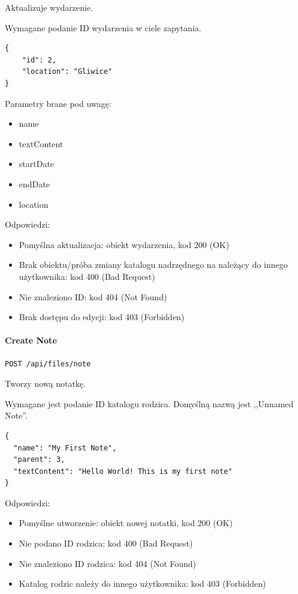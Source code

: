 \documentclass[a4paper,twoside,12pt]{book}
\begin{document}
Aktualizuje wydarzenie.

Wymagane podanie ID wydarzenia w ciele zapytania.

\begin{verbatim}
{
    "id": 2,
    "location": "Gliwice"
}
\end{verbatim}

Parametry brane pod uwagę: 
\begin{itemize}
	\item  name \item  textContent \item  startDate \item  endDate \item location
\end{itemize}

Odpowiedzi: 
\begin{itemize}
	\item Pomyślna aktualizacja: obiekt wydarzenia, kod 200 (OK) 
	\item Brak obiektu/próba zmiany katalogu nadrzędnego na należący do innego użytkownika: kod 400 (Bad Request) 
	\item Nie znaleziono ID: kod 404 (Not Found) 
	\item Brak dostępu do edycji: kod 403 (Forbidden)
\end{itemize}

\paragraph{Create Note}\label{create-note}

\texttt{POST /api/files/note}

Tworzy nową notatkę.

Wymagane jest podanie ID katalogu rodzica. Domyślną nazwą jest ,,Unnamed Note''.

\begin{verbatim}
{
  "name": "My First Note",
  "parent": 3,
  "textContent": "Hello World! This is my first note"
}
\end{verbatim}

Odpowiedzi: 
\begin{itemize}
	\item Pomyślne utworzenie: obiekt nowej notatki, kod 200 (OK) 
	\item Nie podano ID rodzica: kod 400 (Bad Request)
	\item Nie znaleziono ID rodzica: kod 404 (Not Found) 
	\item Katalog rodzic należy do innego użytkownika: kod 403 (Forbidden)
\end{itemize}
\end{document}
